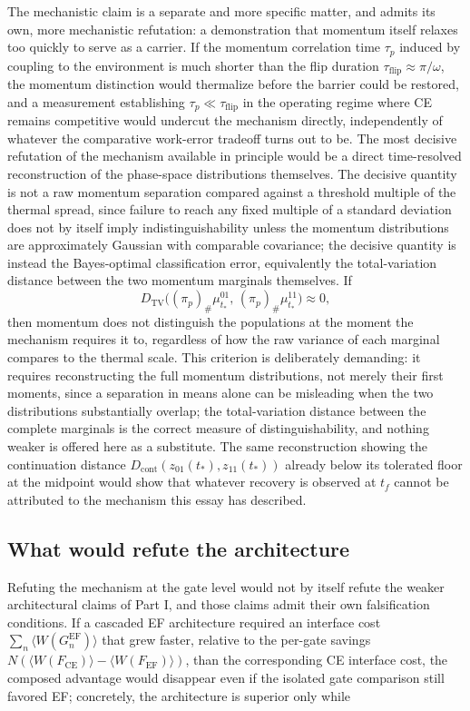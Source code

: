 \documentclass[11pt]{article}
\begin{document}
The mechanistic claim is a separate and more specific matter, and admits its own, more mechanistic refutation: a demonstration that momentum itself relaxes too quickly to serve as a carrier. If the momentum correlation time $\tau_p$ induced by coupling to the environment is much shorter than the flip duration $\tau_{\mathrm{flip}}\approx\pi/\omega$, the momentum distinction would thermalize before the barrier could be restored, and a measurement establishing $\tau_p\ll\tau_{\mathrm{flip}}$ in the operating regime where CE remains competitive would undercut the mechanism directly, independently of whatever the comparative work-error tradeoff turns out to be. The most decisive refutation of the mechanism available in principle would be a direct time-resolved reconstruction of the phase-space distributions themselves. The decisive quantity is not a raw momentum separation compared against a threshold multiple of the thermal spread, since failure to reach any fixed multiple of a standard deviation does not by itself imply indistinguishability unless the momentum distributions are approximately Gaussian with comparable covariance; the decisive quantity is instead the Bayes-optimal classification error, equivalently the total-variation distance between the two momentum marginals themselves. If
\[
D_{\mathrm{TV}}\bigl((\pi_p)_\#\mu_{t_\ast}^{01},\,(\pi_p)_\#\mu_{t_\ast}^{11}\bigr) \approx 0,
\]
then momentum does not distinguish the populations at the moment the mechanism requires it to, regardless of how the raw variance of each marginal compares to the thermal scale. This criterion is deliberately demanding: it requires reconstructing the full momentum distributions, not merely their first moments, since a separation in means alone can be misleading when the two distributions substantially overlap; the total-variation distance between the complete marginals is the correct measure of distinguishability, and nothing weaker is offered here as a substitute. The same reconstruction showing the continuation distance $D_{\mathrm{cont}}(z_{01}(t_\ast),z_{11}(t_\ast))$ already below its tolerated floor at the midpoint would show that whatever recovery is observed at $t_f$ cannot be attributed to the mechanism this essay has described.

\subsection{What would refute the architecture}

Refuting the mechanism at the gate level would not by itself refute the weaker architectural claims of Part I, and those claims admit their own falsification conditions. If a cascaded EF architecture required an interface cost $\sum_n \langle W(G_n^{\mathrm{EF}})\rangle$ that grew faster, relative to the per-gate savings $N(\langle W(F_{\mathrm{CE}})\rangle - \langle W(F_{\mathrm{EF}})\rangle)$, than the corresponding CE interface cost, the composed advantage would disappear even if the isolated gate comparison still favored EF; concretely, the architecture is superior only while
\end{document}
